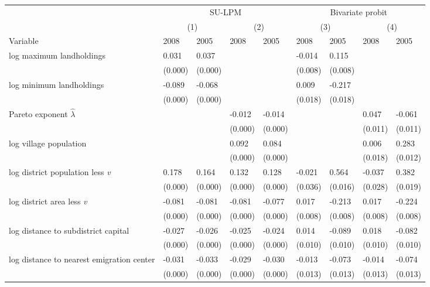 \begin{table}[!h]
\centering
\begin{tabular}{>{\raggedright\arraybackslash}p{2.8cm}llllllll}
\toprule
\multicolumn{1}{c}{ } & \multicolumn{4}{c}{SU-LPM} & \multicolumn{4}{c}{Bivariate probit} \\
\cmidrule(l{3pt}r{3pt}){2-5} \cmidrule(l{3pt}r{3pt}){6-9}
\multicolumn{1}{c}{ } & \multicolumn{2}{c}{(1)} & \multicolumn{2}{c}{(2)} & \multicolumn{2}{c}{(3)} & \multicolumn{2}{c}{(4)} \\
\cmidrule(l{3pt}r{3pt}){2-3} \cmidrule(l{3pt}r{3pt}){4-5} \cmidrule(l{3pt}r{3pt}){6-7} \cmidrule(l{3pt}r{3pt}){8-9}
Variable & 2008 & 2005 & 2008 & 2005 & 2008 & 2005 & 2008 & 2005\\
\midrule
log maximum landholdings & 0.031 & 0.037 &  &  & -0.014 & 0.115 &  & \\
 & (0.000) & (0.000) &  &  & (0.008) & (0.008) &  & \\
log minimum landholdings & -0.089 & -0.068 &  &  & 0.009 & -0.217 &  & \\
 & (0.000) & (0.000) &  &  & (0.018) & (0.018) &  & \\
Pareto exponent $\widehat{\lambda}$ &  &  & -0.012 & -0.014 &  &  & 0.047 & -0.061\\
 &  &  & (0.000) & (0.000) &  &  & (0.011) & (0.011)\\
log village population &  &  & 0.092 & 0.084 &  &  & 0.006 & 0.283\\
 &  &  & (0.000) & (0.000) &  &  & (0.018) & (0.012)\\
log district population less \emph{v} & 0.178 & 0.164 & 0.132 & 0.128 & -0.021 & 0.564 & -0.037 & 0.382\\
 & (0.000) & (0.000) & (0.000) & (0.000) & (0.036) & (0.016) & (0.028) & (0.019)\\
log district area less \emph{v} & -0.081 & -0.081 & -0.081 & -0.077 & 0.017 & -0.213 & 0.017 & -0.224\\
 & (0.000) & (0.000) & (0.000) & (0.000) & (0.008) & (0.008) & (0.008) & (0.008)\\
log distance to subdistrict capital & -0.027 & -0.026 & -0.025 & -0.024 & 0.014 & -0.089 & 0.018 & -0.082\\
 & (0.000) & (0.000) & (0.000) & (0.000) & (0.010) & (0.010) & (0.010) & (0.010)\\
log distance to nearest emigration center & -0.031 & -0.033 & -0.029 & -0.030 & -0.013 & -0.073 & -0.014 & -0.074\\
 & (0.000) & (0.000) & (0.000) & (0.000) & (0.013) & (0.013) & (0.013) & (0.013)\\

\end{tabular}
\end{table}
